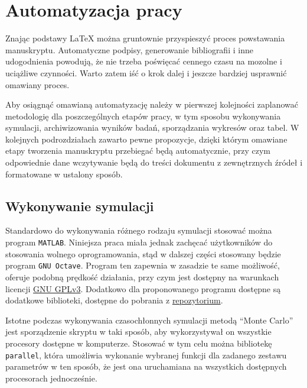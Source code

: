 \chapter{Automatyzacja pracy}

Znając podstawy \LaTeX{} można gruntownie przyspieszyć proces powstawania manuskryptu. Automatyczne podpisy, generowanie bibliografii i inne udogodnienia powodują, że nie trzeba poświęcać cennego czasu na mozolne i uciążliwe czynności. Warto zatem iść o krok dalej i jeszcze bardziej usprawnić omawiany proces.

Aby osiągnąć omawianą automatyzację należy w pierwszej kolejności zaplanować metodologię dla poszczególnych etapów pracy, w tym sposobu wykonywania symulacji, archiwizowania wyników badań, sporządzania wykresów oraz tabel. W kolejnych podrozdziałach zawarto pewne propozycje, dzięki którym omawiane etapy tworzenia manuskryptu przebiegać będą automatycznie, przy czym odpowiednie dane wczytywanie będą do treści dokumentu z zewnętrznych źródeł i formatowane w ustalony sposób.

\section{Wykonywanie symulacji}

Standardowo do wykonywania różnego rodzaju symulacji stosować można program \texttt{MATLAB}. Niniejsza praca miała jednak zachęcać użytkowników do stosowania wolnego oprogramowania, stąd w dalszej części stosowany będzie program \texttt{GNU Octave}. Program ten zapewnia w zasadzie te same możliwość, oferuje podobną prędkość działania, przy czym jest dostępny na warunkach licencji \href{https://www.gnu.org/licenses/gpl-3.0.html}{GNU GPLv3}. Dodatkowo dla proponowanego programu dostępne są dodatkowe biblioteki, dostępne do pobrania z \href{https://octave.sourceforge.io/packages.php}{repozytorium}.

Istotne podczas wykonywania czasochłonnych symulacji metodą \enquote{Monte Carlo}~\cite{jcgm_montecarlo} jest sporządzenie skryptu w taki sposób, aby wykorzystywał on wszystkie procesory dostępne w komputerze. Stosować w tym celu można bibliotekę \texttt{parallel}, która umożliwia wykonanie wybranej funkcji dla zadanego zestawu parametrów w ten sposób, że jest ona uruchamiana na wszystkich dostępnych procesorach jednocześnie.


